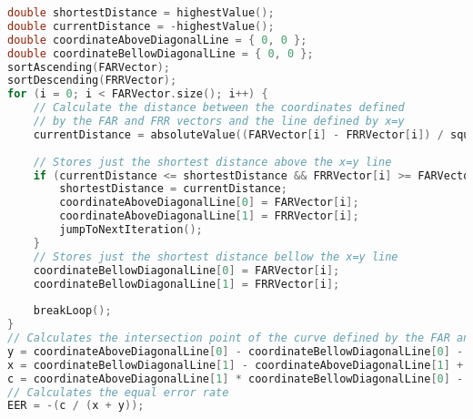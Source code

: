 \begin{lstlisting}[language=C++, caption={EER algorithm}, label={lst:EERAlgo}]
double shortestDistance = highestValue();
double currentDistance = -highestValue();
double coordinateAboveDiagonalLine = { 0, 0 };
double coordinateBellowDiagonalLine = { 0, 0 };
sortAscending(FARVector);
sortDescending(FRRVector);
for (i = 0; i < FARVector.size(); i++) {
	// Calculate the distance between the coordinates defined
	// by the FAR and FRR vectors and the line defined by x=y
	currentDistance = absoluteValue((FARVector[i] - FRRVector[i]) / squaredRoot(2));
	
	// Stores just the shortest distance above the x=y line
	if (currentDistance <= shortestDistance && FRRVector[i] >= FARVector[i]) {
		shortestDistance = currentDistance;
		coordinateAboveDiagonalLine[0] = FARVector[i];
		coordinateAboveDiagonalLine[1] = FRRVector[i];
		jumpToNextIteration();
	}
	// Stores just the shortest distance bellow the x=y line
	coordinateBellowDiagonalLine[0] = FARVector[i];
	coordinateBellowDiagonalLine[1] = FRRVector[i];
	
	breakLoop();
}
// Calculates the intersection point of the curve defined by the FAR and FRR points and the x=y line
y = coordinateAboveDiagonalLine[0] - coordinateBellowDiagonalLine[0] - 1;
x = coordinateBellowDiagonalLine[1] - coordinateAboveDiagonalLine[1] + 1;
c = coordinateAboveDiagonalLine[1] * coordinateBellowDiagonalLine[0] - coordinateAboveDiagonalLine[0] * coordinateBellowDiagonalLine[1];
// Calculates the equal error rate
EER = -(c / (x + y));
\end{lstlisting}